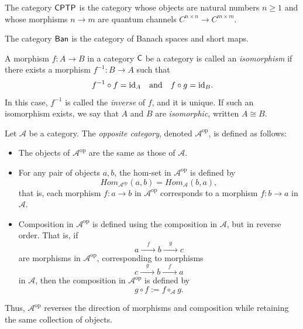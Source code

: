 \begin{example}
The category $\mathsf{CPTP}$ is the category whose objects are natural numbers $n \geq 1$ and whose morphisms $n \rightarrow m$ are quantum channels $C^{n \times n} \rightarrow C^{m\times m}$.
\end{example}

\begin{example}
  The category $\mathsf{Ban}$ is the category of Banach spaces and short maps.
\end{example}


\begin{definition} 
 A morphism $f : A \to B$  in a category $\mathsf{C}$ be a category is called an \emph{isomorphism} if there exists a morphism $f^{-1} : B \to A$ such that
\[
f^{-1} \circ f = \mathrm{id}_A \quad \text{and} \quad f \circ g = \mathrm{id}_B.
\]
In this case, $f^{-1}$ is called the \emph{inverse} of $f$, and it is unique. If such an isomorphism exists, we say that $A$ and $B$ are \emph{isomorphic}, written
$A \cong B.$
\end{definition}

\begin{definition} 
Let \(\mathcal{A}\) be a category. The \emph{opposite category}, denoted \(\mathcal{A}^{\mathrm{op}}\), is defined as follows:
\begin{itemize}
  \item The objects of \(\mathcal{A}^{\mathrm{op}}\) are the same as those of \(\mathcal{A}\).
  \item For any pair of objects \(a, b\), the hom-set in \(\mathcal{A}^{\mathrm{op}}\) is defined by
  \[
  \textit{Hom}_{\mathcal{A}^{\mathrm{op}}}(a, b) = \textit{Hom}_{\mathcal{A}}(b, a),
  \]
  that is, each morphism \(f: a \to b\) in \(\mathcal{A}^{\mathrm{op}}\) corresponds to a morphism \(f: b \to a\) in \(\mathcal{A}\).
  \item Composition in \(\mathcal{A}^{\mathrm{op}}\) is defined using the composition in \(\mathcal{A}\), but in reverse order. That is, if
  \[
  a \xrightarrow{ \quad f \quad } b \xrightarrow{\quad g \quad } c
  \]
  are morphisms in \(\mathcal{A}^{\mathrm{op}}\), corresponding to morphisms
  \[
  c \xrightarrow{ \quad g \quad} b \xrightarrow{ \quad f \quad} a
  \]
  in \(\mathcal{A}\), then the composition in \(\mathcal{A}^{\mathrm{op}}\) is defined by
  \[
  g \circ f := f \circ_{\mathcal{A}} g.
  \]
\end{itemize}

Thus, \(\mathcal{A}^{\mathrm{op}}\) reverses the direction of morphisms and composition while retaining the same collection of objects.
\end{definition}


